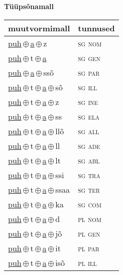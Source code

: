 

\vspace{3.5em}
\noindent \begin{minipage}{\textwidth}
\noindent \textbf{Tüüpsõnamall \,}\\

\begin{sideways}
\begin{tabular}{l l}
muutvormimall & tunnused \\
\hline
\underline{puh}\,$\oplus$\,\underline{a}\,$\oplus$\,z & \textsc{ sg nom } \\
\underline{puh}\,$\oplus$\,t\,$\oplus$\,\underline{a} & \textsc{ sg gen } \\
\underline{puh}\,$\oplus$\,\underline{a}\,$\oplus$\,ssõ & \textsc{ sg par } \\
\underline{puh}\,$\oplus$\,t\,$\oplus$\,\underline{a}\,$\oplus$\,sõ & \textsc{ sg ill } \\
\underline{puh}\,$\oplus$\,t\,$\oplus$\,\underline{a}\,$\oplus$\,z & \textsc{ sg ine } \\
\underline{puh}\,$\oplus$\,t\,$\oplus$\,\underline{a}\,$\oplus$\,ss & \textsc{ sg ela } \\
\underline{puh}\,$\oplus$\,t\,$\oplus$\,\underline{a}\,$\oplus$\,llõ & \textsc{ sg all } \\
\underline{puh}\,$\oplus$\,t\,$\oplus$\,\underline{a}\,$\oplus$\,ll & \textsc{ sg ade } \\
\underline{puh}\,$\oplus$\,t\,$\oplus$\,\underline{a}\,$\oplus$\,lt & \textsc{ sg abl } \\
\underline{puh}\,$\oplus$\,t\,$\oplus$\,\underline{a}\,$\oplus$\,ssi & \textsc{ sg tra } \\
\underline{puh}\,$\oplus$\,t\,$\oplus$\,\underline{a}\,$\oplus$\,ssaa & \textsc{ sg ter } \\
\underline{puh}\,$\oplus$\,t\,$\oplus$\,\underline{a}\,$\oplus$\,ka & \textsc{ sg com } \\
\underline{puh}\,$\oplus$\,t\,$\oplus$\,\underline{a}\,$\oplus$\,d & \textsc{ pl nom } \\
\underline{puh}\,$\oplus$\,t\,$\oplus$\,\underline{a}\,$\oplus$\,jõ & \textsc{ pl gen } \\
\underline{puh}\,$\oplus$\,t\,$\oplus$\,\underline{a}\,$\oplus$\,it & \textsc{ pl par } \\
\underline{puh}\,$\oplus$\,t\,$\oplus$\,\underline{a}\,$\oplus$\,isõ & \textsc{ pl ill } \\

\end{tabular}
\end{sideways}
\end{minipage}
